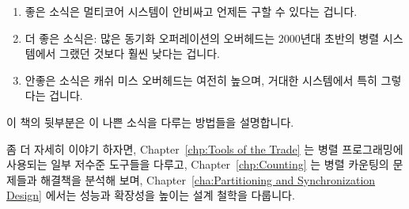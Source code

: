 \begin{enumerate}
\item	좋은 소식은 멀티코어 시스템이 안비싸고 언제든 구할 수 있다는 겁니다.
\item	더 좋은 소식은:  많은 동기화 오퍼레이션의 오버헤드는 2000년대 초반의
	병렬 시스템에서 그랬던 것보다 훨씬 낮다는 겁니다.
\item	안좋은 소식은 캐쉬 미스 오버헤드는 여전히 높으며, 거대한 시스템에서
	특히 그렇다는 겁니다.

\iffalse

\item	The good news is that multicore systems are inexpensive and
	readily available.
\item	More good news:  The overhead of many synchronization operations
	is much lower than it was on parallel systems from the early 2000s.
\item	The bad news is that the overhead of cache misses is still high,
	especially on large systems.

\fi

\end{enumerate}

이 책의 뒷부분은 이 나쁜 소식을 다루는 방법들을 설명합니다.

좀 더 자세히 이야기 하자면,
Chapter~\ref{chp:Tools of the Trade} 는 병렬 프로그래밍에 사용되는 일부 저수준
도구들을 다루고,
Chapter~\ref{chp:Counting} 는 병렬 카운팅의 문제들과 해결책을 분석해 보며,
Chapter~\ref{cha:Partitioning and Synchronization Design}
에서는 성능과 확장성을 높이는 설계 철학을 다룹니다.

\iffalse

The remainder of this book describes ways of handling this bad news.

In particular,
Chapter~\ref{chp:Tools of the Trade} will cover some of the low-level
tools used for parallel programming,
Chapter~\ref{chp:Counting} will investigate problems and solutions to
parallel counting, and
Chapter~\ref{cha:Partitioning and Synchronization Design}
will discuss design disciplines that promote performance and scalability.

\fi

